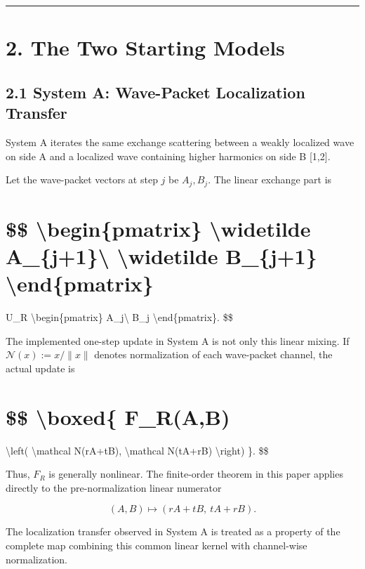 \documentclass[
  a4paper,
  10pt]{article}
\begin{document}
\begin{center}\rule{0.5\linewidth}{0.5pt}\end{center}

\section{2. The Two Starting Models}\label{2-the-two-starting-models}

\subsection{2.1 System A: Wave-Packet Localization
Transfer}\label{21-system-a-wave-packet-localization-transfer}

System A iterates the same exchange scattering between a weakly
localized wave on side A and a localized wave containing higher
harmonics on side B {[}1,2{]}.

Let the wave-packet vectors at step \(j\) be \(A_j,B_j\). The linear
exchange part is

\section{\$\$ \textbackslash begin\{pmatrix\} \textbackslash widetilde
A\_\{j+1\}\textbackslash{} \textbackslash widetilde B\_\{j+1\}
\textbackslash end\{pmatrix\}}\label{-beginpmatrix-widetilde-a_j1-widetilde-b_j1-endpmatrix}

U\_R \textbackslash begin\{pmatrix\} A\_j\textbackslash{} B\_j
\textbackslash end\{pmatrix\}. \$\$

The implemented one-step update in System A is not only this linear
mixing. If \(\mathcal N(x):=x/\|x\|\) denotes normalization of each
wave-packet channel, the actual update is

\section{\$\$ \textbackslash boxed\{ F\_R(A,B)}\label{-boxed-f_rab}

\textbackslash left( \textbackslash mathcal N(rA+tB),
\textbackslash mathcal N(tA+rB) \textbackslash right) \}. \$\$

Thus, \(F_R\) is generally nonlinear. The finite-order theorem in this
paper applies directly to the pre-normalization linear numerator

\[
(A,B)\longmapsto(rA+tB,\ tA+rB).
\]

The localization transfer observed in System A is treated as a property
of the complete map combining this common linear kernel with
channel-wise normalization.
\end{document}
